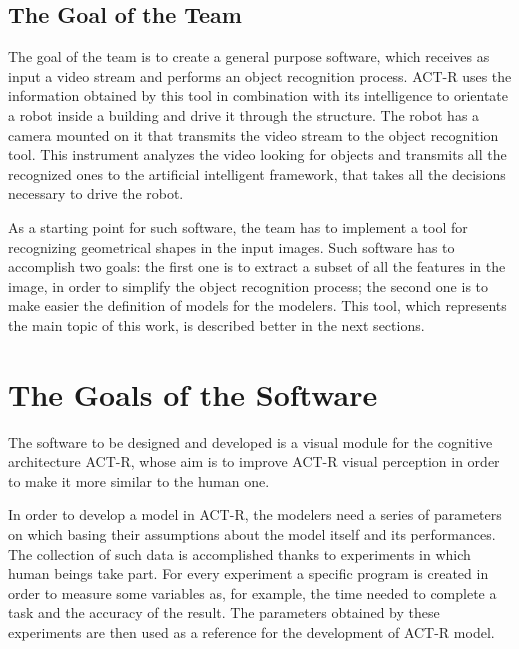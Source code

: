 		\subsection{The Goal of the Team}\label{goalTeam}
		The goal of the team is to create a general purpose software, which receives as input a video stream and performs an object recognition process. \mbox{ACT-R} uses the information obtained by this tool in combination with its intelligence to orientate a robot inside a building and drive it through the structure. The robot has a camera mounted on it that transmits the video stream to the object recognition tool. This instrument analyzes the video looking for objects and transmits all the recognized ones to the artificial intelligent framework, that takes all the decisions necessary to drive the robot. 
	
		As a starting point for such software, the team has to implement a tool for recognizing geometrical shapes in the input images. Such software has to accomplish two goals: the first one is to extract a subset of all the features in the image, in order to simplify the object recognition process; the second one is to make easier the definition of models for the modelers. This tool, which represents the main topic of this work, is described better in the next sections. 

	\section{The Goals of the Software}
	The software to be designed and developed is a visual module for the cognitive architecture ACT-R, whose aim is to improve ACT-R visual perception in order to make it more similar to the human one. 
	
	In order to develop a model in ACT-R, the modelers need a series of parameters on which basing their assumptions about the model itself and its performances.
	The collection of such data is accomplished thanks to experiments in which human beings take part. 
	For every experiment a specific program is created in order to measure some variables as, for example, the time needed to complete a task and the accuracy of the result.
	The parameters obtained by these experiments are then used as a reference for the development of ACT-R model.

